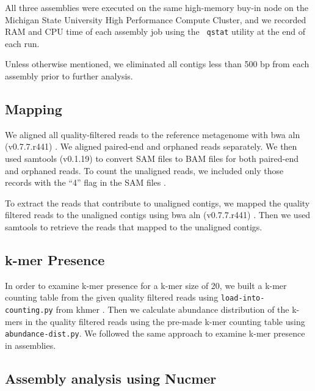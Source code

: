 \documentclass[11pt]{article}
\begin{document}
All three assemblies were executed on the same high-memory buy-in node
on the Michigan State University High Performance Compute Cluster, and
we recorded RAM and CPU time of each assembly job using the {\tt
  qstat} utility at the end of each run.

Unless otherwise mentioned, we eliminated all contigs less than 500 bp
from each assembly prior to further analysis.

\subsection*{Mapping}

We aligned all quality-filtered reads to the reference metagenome with
bwa aln (v0.7.7.r441) \cite{bwa}. We aligned paired-end and orphaned
reads separately. We then used samtools (v0.1.19)
\cite{sam-stools} to convert SAM files to BAM files for both
paired-end and orphaned reads. To count the unaligned reads, we
included only those records with the ``4'' flag in the SAM files
\cite{sam-stools}.
 

To extract the reads that contribute to unaligned contigs, we mapped
the quality filtered reads to the unaligned contigs using bwa aln
(v0.7.7.r441) \cite{bwa}.  Then we used samtools to retrieve the reads
that mapped to the unaligned contigs.





\subsection*{k-mer Presence}
In order to examine k-mer presence for a k-mer size of 20, we built a
k-mer counting table from the given quality filtered reads using
{\tt{load-into-counting.py}} from khmer \cite{khmer2016}. Then we
calculate abundance distribution of the k-mers in the quality filtered
reads using the pre-made k-mer counting table using
{\tt{abundance-dist.py}}. We followed the same approach to examine
k-mer presence in assemblies.

\subsection*{Assembly analysis using Nucmer}
\end{document}
